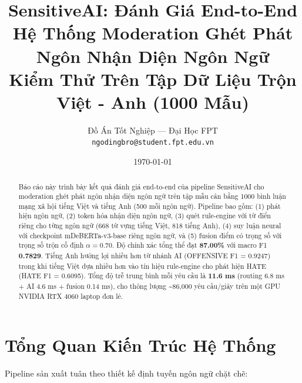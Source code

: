 \documentclass[11pt,a4paper]{article}
\title{
    \vspace{-1cm}
    \textbf{SensitiveAI: Đánh Giá End-to-End Hệ Thống Moderation Ghét Phát Ngôn Nhận Diện Ngôn Ngữ}\\
    \large Kiểm Thử Trên Tập Dữ Liệu Trộn Việt - Anh (1000 Mẫu)
}
\author{
    Đồ Án Tốt Nghiệp --- Đại Học FPT\\
    \texttt{ngodingbro@student.fpt.edu.vn}
}
\date{\today}
\begin{document}
\maketitle

\begin{abstract}
    Báo cáo này trình bày kết quả đánh giá end-to-end của pipeline SensitiveAI cho moderation ghét phát ngôn nhận diện ngôn ngữ trên tập mẫu cân bằng 1000 bình luận mạng xã hội tiếng Việt và tiếng Anh (500 mỗi ngôn ngữ). Pipeline bao gồm: (1) phát hiện ngôn ngữ, (2) token hóa nhận diện ngôn ngữ, (3) quét rule-engine với từ điển riêng cho từng ngôn ngữ (668 từ vựng tiếng Việt, 818 tiếng Anh), (4) suy luận neural với checkpoint mDeBERTa-v3-base riêng ngôn ngữ, và (5) fusion điểm có trọng số với trọng số trộn cố định $\alpha = 0.70$. Độ chính xác tổng thể đạt \textbf{87.00\%} với macro F1 \textbf{0.7829}. Tiếng Anh hưởng lợi nhiều hơn từ nhánh AI (OFFENSIVE F1 = 0.9247) trong khi tiếng Việt dựa nhiều hơn vào tín hiệu rule-engine cho phát hiện HATE (HATE F1 = 0.6095). Tổng độ trễ trung bình mỗi yêu cầu là \textbf{11.6 ms} (routing 6.8 ms + AI 4.6 ms + fusion 0.14 ms), cho thông lượng \textasciitilde 86,000 yêu cầu/giây trên một GPU NVIDIA RTX 4060 laptop đơn lẻ.
\end{abstract}

\section{Tổng Quan Kiến Trúc Hệ Thống}
\label{sec:architecture}

Pipeline sản xuất tuân theo thiết kế định tuyến ngôn ngữ chặt chẽ:
\end{document}
